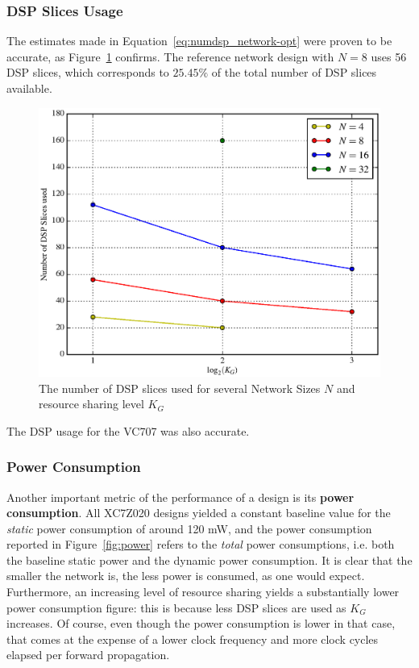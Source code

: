\documentclass{IEEEtran}
\begin{document}
\subsubsection{DSP Slices Usage}\label{sec:results_synth_dsp}
The estimates made in Equation~\ref{eq:numdsp_network-opt} were proven to be accurate, as Figure~\ref{fig:dspused} confirms.
The reference network design with $N=8$ uses 56 DSP slices, which corresponds to $25.45\%$ of the total number of DSP slices available.

\begin{figure}
    \centering
    \includegraphics[width=\linewidth]{figures/dspuse.eps}
    \caption{The number of DSP slices used for several Network Sizes $N$ and resource sharing level $K_G$}
    \label{fig:dspused}
\end{figure}
The DSP usage for the VC707 was also accurate.

\subsubsection{Power Consumption}\label{sec:res-synth-power}
Another important metric of the performance of a design is its \textbf{power consumption}. All  XC7Z020 designs yielded a
constant baseline value for the \emph{static} power consumption of around 120 mW, and the power consumption reported
in Figure~\ref{fig:power} refers to the \emph{total} power consumptions, i.e. both the baseline static power and the dynamic power consumption.
It is clear that the smaller the network is, the less power is consumed, as one would expect. Furthermore, an increasing
level of resource sharing yields a substantially lower power consumption figure: this is because less DSP slices are used as $K_G$ increases.
Of course, even though the power consumption is lower in that case, that comes at the expense of a lower clock frequency and more clock cycles
elapsed per forward propagation.
\end{document}
